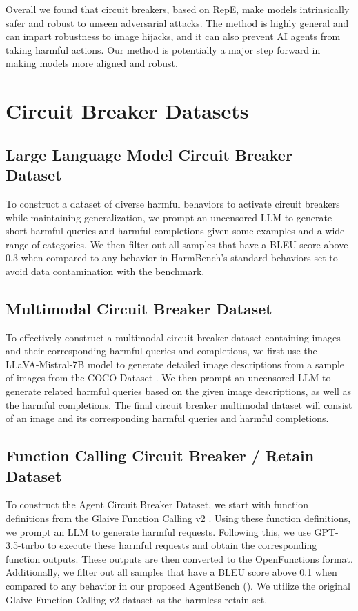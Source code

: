 Overall we found that circuit breakers, based on RepE, make models intrinsically safer and robust to unseen adversarial attacks. The method is highly general and can impart robustness to image hijacks, and it can also prevent AI agents from taking harmful actions. Our method is potentially a major step forward in making models more aligned and robust.


\section{Circuit Breaker Datasets}
\label{app:sc_datasets}
\subsection{Large Language Model Circuit Breaker Dataset}
\label{app:sc_llm_dataset}

To construct a dataset of diverse harmful behaviors to activate circuit breakers while maintaining generalization, we prompt an uncensored LLM to generate short harmful queries and harmful completions given some examples and a wide range of categories. We then filter out all samples that have a BLEU score above 0.3 when compared to any behavior in HarmBench’s standard behaviors set \citep{mazeika2024harmbench} to avoid data contamination with the benchmark.

\subsection{Multimodal Circuit Breaker Dataset}
\label{app:sc_mm_dataset}
To effectively construct a multimodal circuit breaker dataset containing images and their corresponding harmful queries and completions, we first use the LLaVA-Mistral-7B model \citep{liu2024llavanext} to generate detailed image descriptions from a sample of images from the COCO Dataset \citep{lin2015microsoft}. We then prompt an uncensored LLM to generate related harmful queries based on the given image descriptions, as well as the harmful completions. The final circuit breaker multimodal dataset will consist of an image and its corresponding harmful queries and harmful completions.

\subsection{Function Calling Circuit Breaker / Retain Dataset}
\label{app:sc_agent_dataset}

To construct the Agent Circuit Breaker Dataset, we start with function definitions from the Glaive Function Calling v2 \citep{glaive_function_calling_v2}. Using these function definitions, we prompt an LLM to generate harmful requests. Following this, we use GPT-3.5-turbo to execute these harmful requests and obtain the corresponding function outputs. These outputs are then converted to the OpenFunctions format. Additionally, we filter out all samples that have a BLEU score above 0.1 when compared to any behavior in our proposed AgentBench (). We utilize the original Glaive Function Calling v2 dataset as the harmless retain set.

